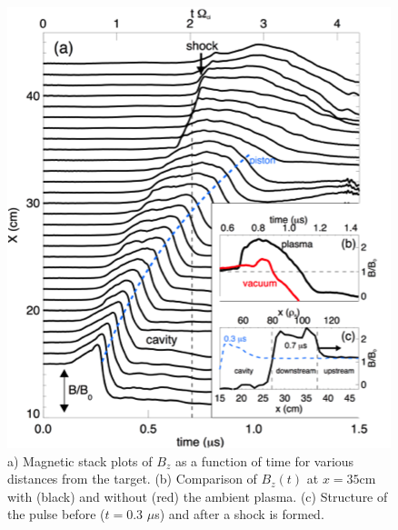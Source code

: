 \documentclass[11pt]{article}
\begin{document}
\begin{description}
\begin{figure}[!htbp]
\centerline{\includegraphics[width=3.0truein]{shock1}}
\caption{a) Magnetic stack plots of $B_{z}$ as a function of time for
  various distances from the target. (b) Comparison of $B_z(t)$ at $x
  = 35$cm with (black) and without (red) the ambient plasma. (c) Structure
  of the pulse before ($t = 0.3$ $\mu$s) and after a shock is formed.}\label{shock1}



\end{figure}
\end{description}
\end{document}
